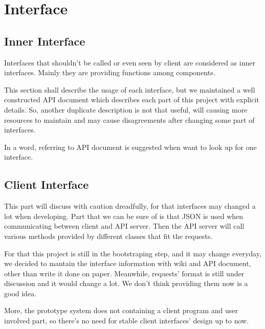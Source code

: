 \section{Interface}
  \subsection{Inner Interface}
    Interfaces that shouldn't be called or even seen by client are considered as inner interfaces.
    Mainly they are providing functions among components.

    This section shall describe the usage of each interface,
    but we maintained a well constructed API document which describes each part of this project with explicit details.
    So, another duplicate description is not that useful,
    will causing more resources to maintain and may cause disagreements after changing some part of interfaces.

    In a word, referring to API document is suggested when want to look up for one interface.

  \subsection{Client Interface}
    This part will discuss with caution dreadfully,
    for that interfaces may changed a lot when developing.
    Part that we can be sure of is that JSON is used when communicating between client and API server.
    Then the API server will call various methods provided by different classes that fit the requests.

    For that this project is still in the bootstraping step, and it may change everyday, we decided to mantain the interface information with
    wiki and API document, other than write it done on paper.
    Meanwhile, requests' format is still under discussion and it would change a lot. We don't think providing them now is a good idea.

    More, the prototype system does not containing a client program and user involved part,
    so there's no need for stable client interfaces' design up to now.


